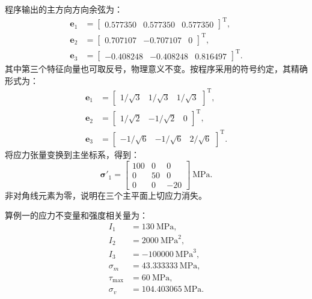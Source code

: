 \documentclass[UTF8,a4paper,12pt]{ctexart}
\newcommand{\stress}{\bm{\sigma}}
\newcommand{\vect}[1]{\bm{#1}}
\begin{document}
程序输出的主方向方向余弦为：
\begin{align}
\vect e_1 &= \begin{bmatrix}0.577350 & 0.577350 & 0.577350\end{bmatrix}^{\mathrm T},\\
\vect e_2 &= \begin{bmatrix}0.707107 & -0.707107 & 0\end{bmatrix}^{\mathrm T},\\
\vect e_3 &= \begin{bmatrix}-0.408248 & -0.408248 & 0.816497\end{bmatrix}^{\mathrm T}.
\end{align}
其中第三个特征向量也可取反号，物理意义不变。按程序采用的符号约定，其精确形式为：
\begin{align}
\vect e_1 &= \begin{bmatrix}1/\sqrt 3 & 1/\sqrt 3 & 1/\sqrt 3\end{bmatrix}^{\mathrm T},\\
\vect e_2 &= \begin{bmatrix}1/\sqrt 2 & -1/\sqrt 2 & 0\end{bmatrix}^{\mathrm T},\\
\vect e_3 &= \begin{bmatrix}-1/\sqrt 6 & -1/\sqrt 6 & 2/\sqrt 6\end{bmatrix}^{\mathrm T}.
\end{align}
将应力张量变换到主坐标系，得到：
\begin{equation}
\stress'_1 =
\begin{bmatrix}
100 & 0 & 0 \\
0 & 50 & 0 \\
0 & 0 & -20
\end{bmatrix}\ \mathrm{MPa}.
\end{equation}
非对角线元素为零，说明在三个主平面上切应力消失。

算例一的应力不变量和强度相关量为：
\begin{align}
I_1 &= 130\ \mathrm{MPa},\\
I_2 &= 2000\ \mathrm{MPa}^2,\\
I_3 &= -100000\ \mathrm{MPa}^3,\\
\sigma_m &= 43.333333\ \mathrm{MPa},\\
\tau_{\max} &= 60\ \mathrm{MPa},\\
\sigma_v &= 104.403065\ \mathrm{MPa}.
\end{align}
\end{document}
